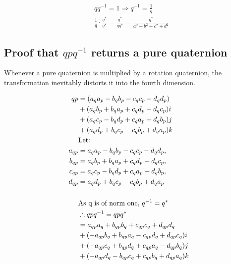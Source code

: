 \documentclass[12pt, a4paper]{article}
\begin{document}
\begin{align*}
     & qq^{-1} = 1 \Rightarrow q^{-1} = \frac{1}{q}         \\
     & \frac{1}{q} \cdot \frac{q^*}{q^*} = \frac{q^*}{qq^*}
    = \frac{q^*}{a^2 + b^2 + c^2 + d^2}
\end{align*}

\subsection{Proof that $qpq^{-1}$ returns a pure quaternion}

Whenever a pure quaternion is multiplied by a rotation quaternion, the
transformation inevitably distorts it into the fourth dimension.


\begin{align*}
    qp     & = (a_qa_p - b_qb_p - c_qc_p - d_qd_p)                \\
           & + (a_qb_p + b_qa_p + c_qd_p - d_qc_p)i               \\
           & + (a_qc_p - b_qd_p + c_qa_p + d_qb_p)j               \\
           & + (a_qd_p + b_qc_p - c_qb_p + d_qa_p)k               \\
           & \text{Let:\space}                                    \\
    a_{qp} & = a_qa_p - b_qb_p - c_qc_p - d_qd_p,                 \\
    b_{qp} & = a_qb_p + b_qa_p + c_qd_p - d_qc_p,                 \\
    c_{qp} & = a_qc_p - b_qd_p + c_qa_p + d_qb_p,                 \\
    d_{qp} & = a_qd_p + b_qc_p - c_qb_p + d_qa_p                  \\
    \\
           & \text{As q is of norm one, } q^{-1} = q^*            \\
           & \therefore qpq^{-1} = qpq^*                          \\
           & = a_{qp}a_q + b_{qp}b_q + c_{qp}c_q + d_{qp}d_q      \\
           & + (- a_{qp}b_q + b_{qp}a_q - c_{qp}d_q + d_{qp}c_q)i \\
           & + (- a_{qp}c_q + b_{qp}d_q + c_{qp}a_q - d_{qp}b_q)j \\
           & + (- a_{qp}d_q - b_{qp}c_q + c_{qp}b_q + d_{qp}a_q)k \\
\end{align*}
\end{document}
